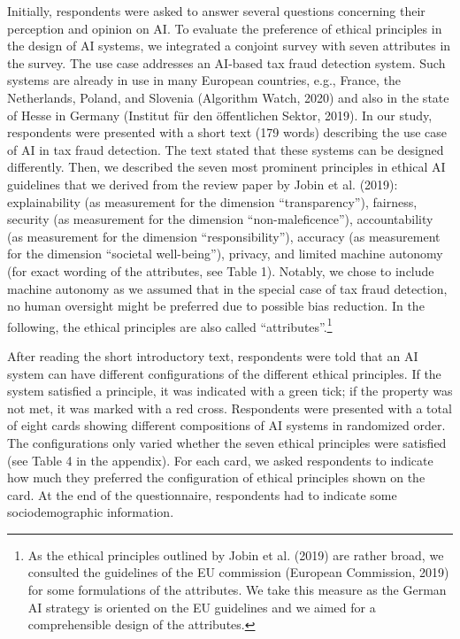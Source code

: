 \documentclass{article}
\begin{document}
Initially, respondents were asked to answer several questions concerning
their perception and opinion on AI. To evaluate the preference of
ethical principles in the design of AI systems, we integrated a conjoint
survey with seven attributes in the survey. The use case addresses an
AI-based tax fraud detection system. Such systems are already in use in
many European countries, e.g., France, the Netherlands, Poland, and
Slovenia (Algorithm Watch, 2020) and also in the state of Hesse in
Germany (Institut für den öffentlichen Sektor, 2019). In our study,
respondents were presented with a short text (179 words) describing the
use case of AI in tax fraud detection. The text stated that these
systems can be designed differently. Then, we described the seven most
prominent principles in ethical AI guidelines that we derived from the
review paper by Jobin et al. (2019): explainability (as measurement for
the dimension ``transparency''), fairness, security (as measurement for
the dimension ``non-maleficence''), accountability (as measurement for
the dimension ``responsibility''), accuracy (as measurement for the
dimension ``societal well-being''), privacy, and limited machine
autonomy (for exact wording of the attributes, see Table 1). Notably, we
chose to include machine autonomy as we assumed that in the special case
of tax fraud detection, no human oversight might be preferred due to
possible bias reduction. In the following, the ethical principles are
also called ``attributes''.\footnote{As the ethical principles outlined
  by Jobin et al. (2019) are rather broad, we consulted the guidelines
  of the EU commission (European Commission, 2019) for some formulations
  of the attributes. We take this measure as the German AI strategy is
  oriented on the EU guidelines and we aimed for a comprehensible design
  of the attributes.}

After reading the short introductory text, respondents were told that an
AI system can have different configurations of the different ethical
principles. If the system satisfied a principle, it was indicated with a
green tick; if the property was not met, it was marked with a red cross.
Respondents were presented with a total of eight cards showing different
compositions of AI systems in randomized order. The configurations only
varied whether the seven ethical principles were satisfied (see Table 4
in the appendix). For each card, we asked respondents to indicate how
much they preferred the configuration of ethical principles shown on the
card. At the end of the questionnaire, respondents had to indicate some
sociodemographic information.
\end{document}
